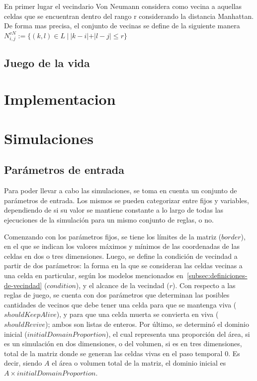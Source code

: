 \documentclass[11pt]{article}
\begin{document}
    En primer lugar el vecindario Von Neumann considera como vecina a aquellas celdas que se encuentran dentro del rango r
    considerando la distancia Manhattan. De forma mas precisa, el conjunto de vecinas se define de la siguiente manera
    $N_{i,j}^{vN}:=\{(k,l) \in L\ |\ |k-i|+ |l - j| \leq r\}$


    \subsection{Juego de la vida}\label{subsec:juego-de-la-vida}


    \section{Implementacion}\label{sec:implementacion}


    \section{Simulaciones}\label{sec:simulaciones}

    \subsection{Parámetros de entrada}\label{subsec:parametros-de-entrada}

    Para poder llevar a cabo las simulaciones, se toma en cuenta un conjunto de parámetros de entrada.
    Los mismos se pueden categorizar entre fijos y variables, dependiendo de si su valor se mantiene
    constante a lo largo de todas las ejecuciones de la simulación para un mismo conjunto de reglas, o no.

    Comenzando con los parámetros fijos, se tiene los límites de la matriz ($border$),
    en el que se indican los valores máximos y mínimos de las coordenadas de las celdas en dos o tres dimensiones.
    Luego, se define la condición de vecindad a partir de dos parámetros:
    la forma en la que se consideran las celdas vecinas a una celda en particular, según los modelos mencionados
    en~\ref{subsec:definiciones-de-vecindad} ($condition$), y el alcance de la vecindad ($r$).
    Con respecto a las reglas de juego, se cuenta con dos parámetros que determinan las posibles cantidades de
    vecinos que debe tener una celda para que se mantenga viva ($shouldKeepAlive$),
    y para que una celda muerta se convierta en viva ($shouldRevive$); ambos son listas de enteros.
    Por último, se determinó el dominio inicial ($initialDomainProportion$), el
    cual representa una proporción del área, si es un simulación en dos dimensiones, o del volumen,
    si es en tres dimensiones, total de la matriz donde se generan las celdas vivas en el paso temporal 0.
    Es decir, siendo $A$ el área o volumen total de la matriz, el dominio inicial es $A \times initialDomainProportion$.
\end{document}
